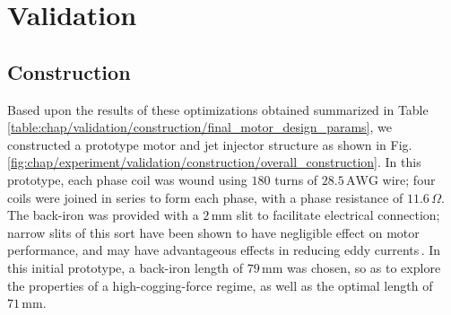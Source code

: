 \section{Validation}                                \label{Chapter:experiment/validation}


        \subsection{Construction}                   \label{Chapter:construction}
        
        
            Based upon the results of these optimizations obtained summarized in Table\,\ref{table:chap/validation/construction/final_motor_design_params}, we constructed a prototype motor and jet injector structure as shown in Fig.\,\ref{fig:chap/experiment/validation/construction/overall_construction}. In this prototype, each phase coil was wound using $180$ turns of $28.5\,\mathrm{AWG}$ wire; four coils were joined in series to form each phase, with a phase resistance of $11.6\,\Omega$. The back-iron was provided with a $2\,\mathrm{mm}$ slit to facilitate electrical connection; narrow slits of this sort have been shown to have negligible effect on motor performance, and may have advantageous effects in reducing eddy currents\,\cite{Meessen2009}. In this initial prototype, a back-iron length of $79\,\mathrm{mm}$ was chosen, so as to explore the properties of a high-cogging-force regime, as well as the optimal length of $71\,\mathrm{mm}$.
        
